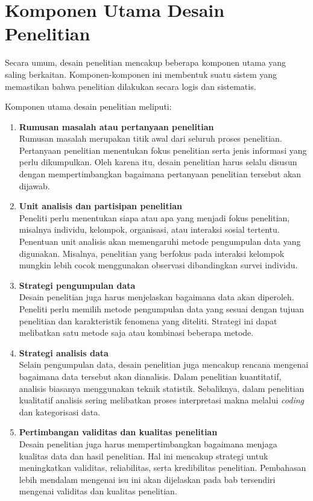 \documentclass[
  indonesian,
  letterpaper,
  DIV=11,
  numbers=noendperiod]{scrreprt}
\begin{document}
\section{Komponen Utama Desain
Penelitian}\label{komponen-utama-desain-penelitian}

Secara umum, desain penelitian mencakup beberapa komponen utama yang
saling berkaitan. Komponen-komponen ini membentuk suatu sistem yang
memastikan bahwa penelitian dilakukan secara logis dan sistematis.

Komponen utama desain penelitian meliputi:

\begin{enumerate}
\def\labelenumi{\arabic{enumi}.}
\item
  \textbf{Rumusan masalah atau pertanyaan penelitian}\\
  Rumusan masalah merupakan titik awal dari seluruh proses penelitian.
  Pertanyaan penelitian menentukan fokus penelitian serta jenis
  informasi yang perlu dikumpulkan. Oleh karena itu, desain penelitian
  harus selalu disusun dengan mempertimbangkan bagaimana pertanyaan
  penelitian tersebut akan dijawab.
\item
  \textbf{Unit analisis dan partisipan penelitian}\\
  Peneliti perlu menentukan siapa atau apa yang menjadi fokus
  penelitian, misalnya individu, kelompok, organisasi, atau interaksi
  sosial tertentu. Penentuan unit analisis akan memengaruhi metode
  pengumpulan data yang digunakan. Misalnya, penelitian yang berfokus
  pada interaksi kelompok mungkin lebih cocok menggunakan observasi
  dibandingkan survei individu.
\item
  \textbf{Strategi pengumpulan data}\\
  Desain penelitian juga harus menjelaskan bagaimana data akan
  diperoleh. Peneliti perlu memilih metode pengumpulan data yang sesuai
  dengan tujuan penelitian dan karakteristik fenomena yang diteliti.
  Strategi ini dapat melibatkan satu metode saja atau kombinasi beberapa
  metode.
\item
  \textbf{Strategi analisis data}\\
  Selain pengumpulan data, desain penelitian juga mencakup rencana
  mengenai bagaimana data tersebut akan dianalisis. Dalam penelitian
  kuantitatif, analisis biasanya menggunakan teknik statistik.
  Sebaliknya, dalam penelitian kualitatif analisis sering melibatkan
  proses interpretasi makna melalui \emph{coding} dan kategorisasi data.
\item
  \textbf{Pertimbangan validitas dan kualitas penelitian}\\
  Desain penelitian juga harus mempertimbangkan bagaimana menjaga
  kualitas data dan hasil penelitian. Hal ini mencakup strategi untuk
  meningkatkan validitas, reliabilitas, serta kredibilitas penelitian.
  Pembahasan lebih mendalam mengenai isu ini akan dijelaskan pada bab
  tersendiri mengenai validitas dan kualitas penelitian.
\end{enumerate}
\end{document}
